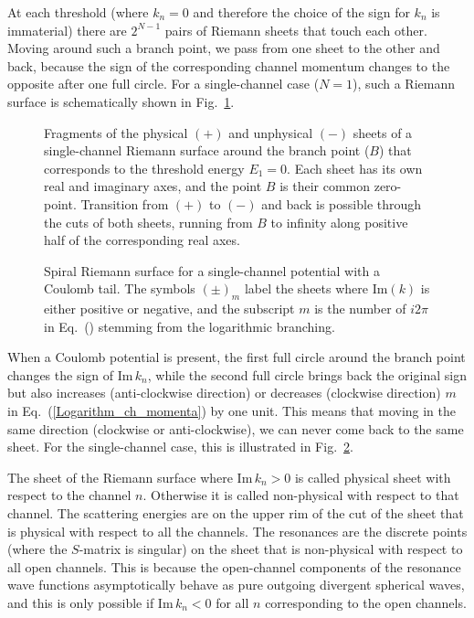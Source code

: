 \documentclass[12pt]{article}
\begin{document}
At each threshold (where $k_n=0$ and therefore the
choice of the sign for $k_n$ is immaterial) there are $2^{N-1}$ pairs of
Riemann sheets that touch each other. Moving around such a branch point, we
pass from one sheet to the other and back, because the sign of the
corresponding channel momentum changes to the opposite after one full circle.
For a single-channel case ($N=1$), such a Riemann surface is schematically
shown in Fig.~\ref{fig.1ch_Riemann}.

\begin{figure}
\centerline{}
\caption{\sf
Fragments of the physical $(+)$ and unphysical $(-)$ sheets of a
single-channel Riemann surface around the branch point ($B$) that
corresponds to the threshold energy $E_1=0$. Each sheet has its own real and
imaginary axes, and the point $B$ is their common zero-point.
Transition from $(+)$ to $(-)$ and back is possible through the
cuts of both sheets, running from $B$ to infinity along positive half of the
corresponding real axes.
}
\label{fig.1ch_Riemann}
\end{figure}
\begin{figure}
\centerline{}
\caption{\sf
Spiral Riemann surface for a single-channel potential with a Coulomb tail. The
symbols $(\pm)_m$ label the sheets where $\mathrm{Im}(k)$ is either positive or
negative, and the subscript $m$ is the number of $i2\pi$ in
Eq.~(\protect{\ref{Logarithm_ch_momenta}}) stemming from the logarithmic
branching.
}
\label{fig.single.Coulomb.Riemann}
\end{figure}

When a Coulomb potential is present, the first full circle around the branch 
point changes the sign of $\mathrm{Im}\,k_n$, while the second full circle 
brings back the original sign but also increases (anti-clockwise direction) or 
decreases (clockwise direction) $m$ in Eq.~(\ref{Logarithm_ch_momenta}) by one 
unit. This means that moving in the same direction (clockwise or 
anti-clockwise), we can never come back to the same sheet. For the 
single-channel case, this is illustrated in 
Fig.~\ref{fig.single.Coulomb.Riemann}.

The sheet of the Riemann surface where $\mathrm{Im}\,k_n>0$ is called physical 
sheet with respect to the channel $n$. Otherwise it is called non-physical with 
respect to that channel. The scattering energies are on the upper rim of the cut 
of the sheet that is physical with respect to all the channels. The resonances 
are the discrete points (where the $S$-matrix is singular) on the sheet that is 
non-physical with respect to all open channels. This is because the open-channel 
components of the resonance wave functions asymptotically behave as pure 
outgoing divergent spherical waves, and this is only possible if 
$\mathrm{Im}\,k_n<0$ for all $n$ corresponding to the open channels.
\end{document}
